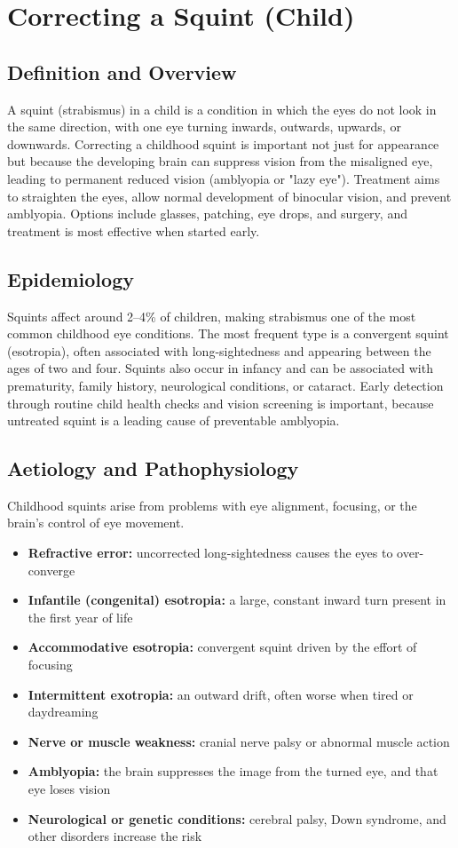 \chapter{Correcting a Squint (Child)}

\section*{Definition and Overview}
A squint (strabismus) in a child is a condition in which the eyes do not look in the same direction, with one eye turning inwards, outwards, upwards, or downwards. Correcting a childhood squint is important not just for appearance but because the developing brain can suppress vision from the misaligned eye, leading to permanent reduced vision (amblyopia or "lazy eye"). Treatment aims to straighten the eyes, allow normal development of binocular vision, and prevent amblyopia. Options include glasses, patching, eye drops, and surgery, and treatment is most effective when started early.

\section*{Epidemiology}
Squints affect around 2--4\% of children, making strabismus one of the most common childhood eye conditions. The most frequent type is a convergent squint (esotropia), often associated with long-sightedness and appearing between the ages of two and four. Squints also occur in infancy and can be associated with prematurity, family history, neurological conditions, or cataract. Early detection through routine child health checks and vision screening is important, because untreated squint is a leading cause of preventable amblyopia.

\section*{Aetiology and Pathophysiology}
Childhood squints arise from problems with eye alignment, focusing, or the brain's control of eye movement.

\begin{itemize}
    \item \textbf{Refractive error:} uncorrected long-sightedness causes the eyes to over-converge
    \item \textbf{Infantile (congenital) esotropia:} a large, constant inward turn present in the first year of life
    \item \textbf{Accommodative esotropia:} convergent squint driven by the effort of focusing
    \item \textbf{Intermittent exotropia:} an outward drift, often worse when tired or daydreaming
    \item \textbf{Nerve or muscle weakness:} cranial nerve palsy or abnormal muscle action
    \item \textbf{Amblyopia:} the brain suppresses the image from the turned eye, and that eye loses vision
    \item \textbf{Neurological or genetic conditions:} cerebral palsy, Down syndrome, and other disorders increase the risk
\end{itemize}

